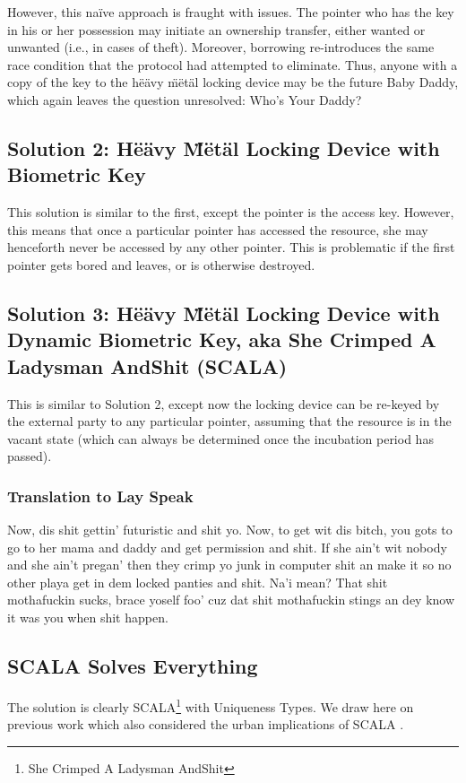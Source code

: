 \documentclass[nocopyrightspace,10pt]{sigplanconf}
\begin{document}
However, this na\"{i}ve approach is fraught with issues. The pointer who has the key in his or her possession may initiate an ownership transfer, either wanted or unwanted (i.e., in cases of theft). Moreover, borrowing re-introduces the same race condition that the protocol had attempted to eliminate. Thus, anyone with a copy of the key to the h\"{e}\"{a}vy \"{m}\"{e}t\"{a}l locking device may be the future Baby Daddy, which again leaves the question unresolved: Who's Your Daddy?

\subsection{Solution 2: H\"{e}\"{a}vy \"{M}\"{e}t\"{a}l Locking Device with Biometric Key}
This solution is similar to the first, except the pointer is the access key. However, this means that once a particular pointer has accessed the resource, she may henceforth never be accessed by any other pointer. This is problematic if the first pointer gets bored and leaves, or is otherwise destroyed.

\subsection{Solution 3: H\"{e}\"{a}vy \"{M}\"{e}t\"{a}l Locking Device with Dynamic Biometric Key, aka She Crimped A Ladysman AndShit (SCALA)}
This is similar to Solution 2, except now the locking device can be re-keyed by the external party to any particular pointer, assuming that the resource is in the vacant state (which can always be determined once the incubation period has passed).

\subsubsection{Translation to Lay Speak}
Now, dis shit gettin' futuristic and shit yo. Now, to get wit dis bitch, you gots to go to her mama and daddy and get permission and shit. If she ain't wit nobody and she ain't pregan' then they crimp yo junk in computer shit an make it so no other playa get in dem locked panties and shit. Na'i mean? That shit mothafuckin sucks, brace yoself foo' cuz dat shit mothafuckin stings an dey know it was you when shit happen.

\subsection{SCALA Solves Everything}
The solution is clearly SCALA\footnote{She Crimped A Ladysman AndShit} with Uniqueness Types. We draw here on previous work which also considered the urban implications of SCALA \cite{pimp-my-library}.
\end{document}

